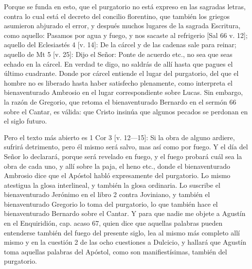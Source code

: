 Porque se funda en esto, que el purgatorio no está expreso en las sagradas letras, contra lo cual está el decreto del concilio florentino, que también los griegos asumieron abjurado el error, y después muchos lugares de la sagrada Escritura, como aquello: Pasamos por agua y fuego, y nos sacaste al refrigerio [Sal 66 v. 12]; aquello del Eclesiastés 4 [v. 14]: De la cárcel y de las cadenas sale para reinar; aquello de Mt 5 [v. 25]: Dijo el Señor: Ponte de acuerdo etc., no sea que seas echado en la cárcel. En verdad te digo, no saldrás de allí hasta que pagues el último cuadrante. Donde por cárcel entiende el lugar del purgatorio, del que el hombre no es liberado hasta haber satisfecho plenamente, como interpreta el bienaventurado Ambrosio en el lugar correspondiente sobre Lucas. Sin embargo, la razón de Gregorio, que retoma el bienaventurado Bernardo en el sermón 66 sobre el Cantar, es válida: que Cristo insinúa que algunos pecados se perdonan en el siglo futuro.

Pero el texto más abierto es 1 Cor 3 [v. 12—15]: Si la obra de alguno ardiere, sufrirá detrimento, pero él mismo será salvo, mas así como por fuego. Y el día del Señor lo declarará, porque será revelado en fuego, y el fuego probará cuál sea la obra de cada uno, y allí sobre la paja, el heno etc., donde el bienaventurado Ambrosio dice que el Apóstol habló expresamente del purgatorio. Lo mismo atestigua la glosa interlineal, y también la glosa ordinaria. Lo suscribe el bienaventurado Jerónimo en el libro 2 contra Joviniano, y también el bienaventurado Gregorio lo toma del purgatorio, lo que también hace el bienaventurado Bernardo sobre el Cantar. Y para que nadie me objete a Agustín en el Enquiridión, cap. acaso 67, quien dice que aquellas palabras pueden entenderse también del fuego del presente siglo, lea al mismo más completo allí mismo y en la cuestión 2 de las ocho cuestiones a Dulcicio, y hallará que Agustín toma aquellas palabras del Apóstol, como son manifiestísimas, también del purgatorio.

